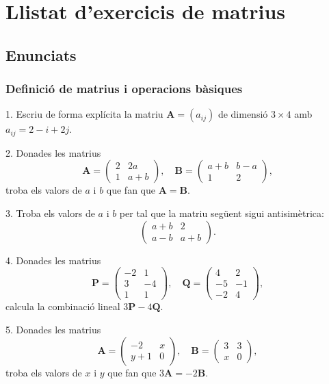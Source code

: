 \documentclass[12pt]{article}
\newcommand{\mat}[1]{\mathbf{#1}}
\begin{document}
\section{Llistat d'exercicis de matrius}
\subsection{Enunciats}
\subsubsection{Definició de matrius i operacions bàsiques}
\begin{exercici}
1. Escriu de forma explícita la matriu $\mat{A} = (a_{ij})$ de dimensió $3 \times 4$ amb $a_{ij} = 2 - i + 2j$.
\end{exercici}

\begin{exercici}
2. Donades les matrius 
\[
\mat{A} = 
\begin{pmatrix}
2 & 2a \\
1 & a+b
\end{pmatrix}, \quad 
\mat{B} = 
\begin{pmatrix}
a+b & b-a \\
1 & 2
\end{pmatrix},
\]
troba els valors de $a$ i $b$ que fan que $\mat{A} = \mat{B}$.
\end{exercici}

\begin{exercici}
3. Troba els valors de $a$ i $b$ per tal que la matriu següent sigui antisimètrica:
\[
\begin{pmatrix}
a+b & 2 \\
a-b & a+b
\end{pmatrix}.
\]
\end{exercici}

\begin{exercici}
4. Donades les matrius 
\[
\mat{P} = 
\begin{pmatrix}
-2 & 1 \\
3 & -4 \\
1 & 1
\end{pmatrix}, \quad 
\mat{Q} = 
\begin{pmatrix}
4 & 2 \\
-5 & -1 \\
-2 & 4
\end{pmatrix},
\]
calcula la combinació lineal $3\mat{P} - 4\mat{Q}$.
\end{exercici}

\begin{exercici}
5. Donades les matrius 
\[
\mat{A} = 
\begin{pmatrix}
-2 & x \\
y+1 & 0
\end{pmatrix}, \quad 
\mat{B} = 
\begin{pmatrix}
3 & 3 \\
x & 0
\end{pmatrix},
\]
troba els valors de $x$ i $y$ que fan que $3\mat{A} = -2\mat{B}$.
\end{exercici}
\end{document}
